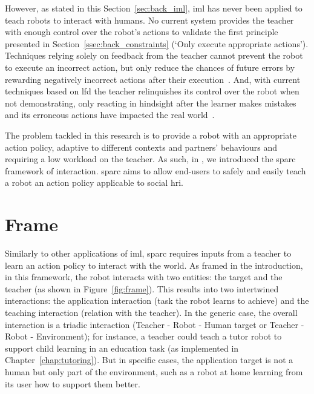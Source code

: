 However, as stated in this Section~\ref{sec:back_iml}, \gls{iml} has never been applied to teach robots to interact with humans. No current system provides the teacher with enough control over the robot's actions to validate the first principle presented in Section~\ref{ssec:back_constraints} (`Only execute appropriate actions'). Techniques relying solely on feedback from the teacher cannot prevent the robot to execute an incorrect action, but only reduce the chances of future errors by rewarding negatively incorrect actions after their execution~\citep{senft2017supervised}. And, with current techniques based on \gls{lfd} the teacher relinquishes its control over the robot when not demonstrating, only reacting in hindsight after the learner makes mistakes and its erroneous actions have impacted the real world~\citep{chernova2009interactive}.

The problem tackled in this research is to provide a robot with an appropriate action policy, adaptive to different contexts and partners' behaviours and requiring a low workload on the teacher. As such, in \cite{senft2015sparc}, we introduced the \gls{sparc} framework of interaction. \gls{sparc} aims to allow end-users to safely and easily teach a robot an action policy applicable to social \gls{hri}.


\section{Frame}

Similarly to other applications of \gls{iml}, \gls{sparc} requires inputs from a teacher to learn an action policy to interact with the world. As framed in the introduction, in this framework, the robot interacts with two entities: the target and the teacher (as shown in Figure~\ref{fig:frame}). This results into two intertwined interactions: the application interaction (task the robot learns to achieve) and the teaching interaction (relation with the teacher). In the generic case, the overall interaction is a triadic interaction (Teacher - Robot - Human target or Teacher - Robot - Environment); for instance, a teacher could teach a tutor robot to support child learning in an education task (as implemented in Chapter~\ref{chap:tutoring}). But in specific cases, the application target is not a human but only part of the environment, such as a robot at home learning from its user how to support them better.

